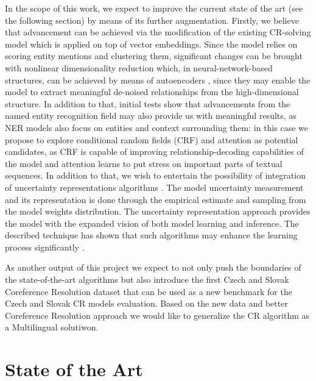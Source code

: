 In the scope of this work, we expect to improve the current state of the art (see the following section) by means of its further augmentation. 
Firstly, we believe that advancement can be achieved via the modification of the existing CR-solving model which is applied on top of vector embeddings. 
Since the model relies on scoring entity mentions and clustering them, significant changes can be brought with nonlinear dimensionality reduction which, in neural-network-based structures, can be achieved by means of autoencoders \cite{autoencoders-Zabalza2016,autoencoders-Sahay2019}, since they may enable the model to extract meaningful de-noised relationships from the high-dimensional structure. 
In addition to that, initial tests show that advancements from the named entity recognition field may also provide us with meaningful results, as NER models also focus on entities and context surrounding them: in this case we propose to explore conditional random fields (CRF) \cite{ner-Strakova2019,ner-Zhanming2019,ner-Zhanming2019} and attention \cite{ner-Yamada2020} as potential candidates, as CRF is capable of improving relationship-decoding capabilities of the model and attention learns to put stress on important parts of textual sequences. 
In addition to that, we wish to entertain the possibility of integration of uncertainty representations algorithms \cite{lakshminarayanan2016simple, gal2017deep,welling2011bayesian}. 
The model uncertainty measurement and its representation is done through the empirical estimate and sampling from the model weights distribution. 
The uncertainty representation approach provides the model with the expanded vision of both model learning and inference. 
The described technique has shown that such algorithms may enhance the learning process significantly \cite{ovadia2019can}.

As another output of this project we expect to not only push the boundaries of the state-of-the-art algorithms but also introduce the first Czech and Slovak Coreference Resolution dataset that can be used as a new benchmark for the Czech and Slovak CR models evaluation. Based on the new data and better Coreference Resolution approach  we would like to generalize the CR algorithm as a Multilingual solutiwon.


\section{State of the Art}\label{sec:sota}

